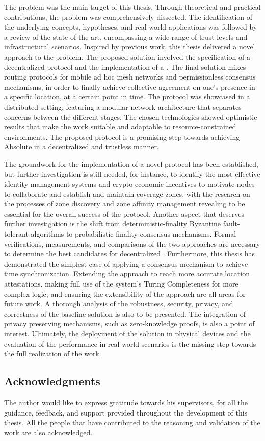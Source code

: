The \pol{} problem was the main target of this thesis. Through theoretical and practical contributions, the problem was comprehensively dissected. The identification of the underlying concepts, hypotheses, and real-world applications was followed by a review of the state of the art, encompassing a wide range of trust levels and infrastructural scenarios. Inspired by previous work, this thesis delivered a novel approach to the problem. The proposed solution involved the specification of a decentralized \pol{} protocol and the implementation of a \poc{}. The final solution mixes routing protocols for mobile ad hoc mesh networks and permissionless consensus mechanisms, in order to finally achieve collective agreement on one's presence in a specific location, at a certain point in time. The protocol was showcased in a distributed setting, featuring a modular network architecture that separates concerns between the different stages. The chosen technologies showed optimistic results that make the work suitable and adaptable to resource-constrained environments. The proposed protocol is a promising step towards achieving Absolute \pol{} in a decentralized and trustless manner.

The groundwork for the implementation of a novel \pol{} protocol has been established, but further investigation is still needed, for instance, to identify the most effective identity management systems and crypto-economic incentives to motivate nodes to collaborate and establish and maintain coverage zones, with the research on the processes of zone discovery and zone affinity management revealing to be essential for the overall success of the protocol. Another aspect that deserves further investigation is the shift from deterministic-finality Byzantine fault-tolerant algorithms to probabilistic finality consensus mechanisms. Formal verifications, measurements, and comparisons of the two approaches are necessary to determine the best candidates for decentralized \pol{}. Furthermore, this thesis has demonstrated the simplest case of applying a consensus mechanism to achieve time synchronization. Extending the approach to reach more accurate location attestations, making full use of the system's Turing Completeness for more complex logic, and ensuring the extensibility of the approach are all areas for future work. A thorough analysis of the robustness, security, privacy, and correctness of the baseline solution is also to be presented. The integration of privacy preserving mechanisms, such as zero-knowledge proofs, is also a point of interest. Ultimately, the deployment of the solution in physical devices and the evaluation of the performance in real-world scenarios is the missing step towards the full realization of the work.

\newpage

\subsection*{Acknowledgments}

The author would like to express gratitude towards his supervisors, for all the guidance, feedback, and support provided throughout the development of this thesis. All the people that have contributed to the reasoning and validation of the work are also acknowledged.